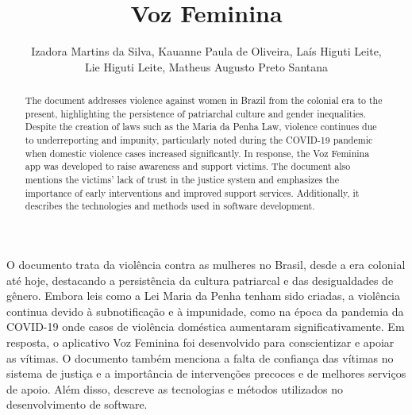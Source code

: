 \documentclass[
    article,			%
    12pt,				%
    oneside,            %
    a4paper,			%
    english,			%
    brazil,				%
    ]{abntex2}
\title{Voz Feminina}
\author{Izadora Martins da Silva, Kauanne Paula de Oliveira, Laís Higuti Leite, \\ Lie Higuti Leite, Matheus Augusto Preto Santana}
\begin{document}
 

\maketitle

\begin{abstract}
    The document addresses violence against women in Brazil from the colonial era to the present, highlighting the persistence of patriarchal culture and gender inequalities. Despite the creation of laws such as the Maria da Penha Law, violence continues due to underreporting and impunity, particularly noted during the COVID-19 pandemic when domestic violence cases increased significantly. In response, the Voz Feminina app was developed to raise awareness and support victims. The document also mentions the victims' lack of trust in the justice system and emphasizes the importance of early interventions and improved support services. Additionally, it describes the technologies and methods used in software development.\end{abstract}
     
\begin{resumo1} 
    O documento trata da violência contra as mulheres no Brasil, desde a era colonial até hoje, destacando a persistência da cultura patriarcal e das desigualdades de gênero. Embora leis como a Lei Maria da Penha tenham sido criadas, a violência continua devido à subnotificação e à impunidade, como na época da pandemia da COVID-19 onde casos de violência doméstica aumentaram significativamente. Em resposta, o aplicativo Voz Feminina foi desenvolvido para conscientizar e apoiar as vítimas. O documento também menciona a falta de confiança das vítimas no sistema de justiça e a importância de intervenções precoces e de melhores serviços de apoio. Além disso, descreve as tecnologias e métodos utilizados no desenvolvimento de software.
\end{resumo1}
\end{document}

